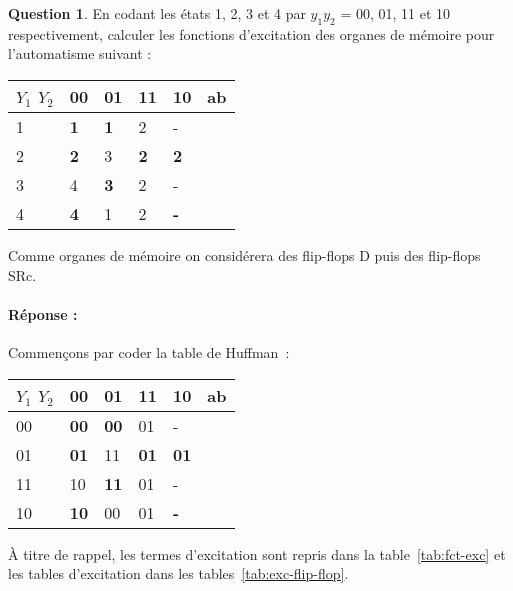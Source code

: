 \documentclass[11pt,a4paper,dvipsnames,]{article}
\theoremstyle{definition}%
\newtheorem{Q}{Question}[] %
\newcommand{\reponse}[1]{%
	\ifthenelse {\boolean{corrige}} {\paragraph{Réponse :} \color{darkblue}   #1\color{black}} {}
 }
\begin{document}
\begin{Q}
	En codant les états 1, 2, 3 et 4 par $y_1y_2$ = 00, 01, 11 et 10 respectivement, calculer les fonctions d'excitation des organes de mémoire pour l'automatisme suivant :


	\begin{center}
		\begin{tabular}{|l|l|l|l|l|l}
		\hline
		$Y_1$ $Y_2$ & 00         & 01         & 11         & 10         & \multicolumn{1}{l|}{ab} \\ \hline
		1           & \textbf{1} & \textbf{1} & 2          & -          &                         \\ \cline{1-5}
		2           & \textbf{2} & 3          & \textbf{2} & \textbf{2} &                         \\ \cline{1-5}
		3           & 4          & \textbf{3} & 2          & -          &                         \\ \cline{1-5}
		4           & \textbf{4} & 1          & 2          & \textbf{-} &                         \\ \cline{1-5}
		\end{tabular}
	\end{center}
	Comme organes de mémoire on considérera des flip-flops D puis des flip-flops SRc.

	\reponse{
		Commençons par coder la table de Huffman~:
		\begin{center}
			\begin{tabular}{|l|l|l|l|l|l}
			\hline
			$Y_1$ $Y_2$ & 00         & 01         & 11         & 10         & \multicolumn{1}{l|}{ab} \\ \hline
			00           & \textbf{00} & \textbf{00} & 01          & -          &                         \\ \cline{1-5}
			01           & \textbf{01} & 11          & \textbf{01} & \textbf{01} &                         \\ \cline{1-5}
			11           & 10          & \textbf{11} & 01          & -          &                         \\ \cline{1-5}
			10           & \textbf{10} & 00          & 01          & \textbf{-} &                         \\ \cline{1-5}
			\end{tabular}
		\end{center}

		À titre de rappel, les termes d'excitation sont repris dans la table~\ref{tab:fct-exc} et les tables d'excitation dans les tables~\ref{tab:exc-flip-flop}.

}
\end{Q}
\end{document}
